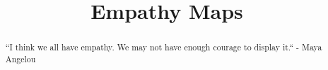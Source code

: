 \documentclass{ximera}
\title{Empathy Maps}
\begin{document}
\begin{abstract}
``I think we all have empathy. We may not have enough courage to display it.`` - Maya Angelou
\end{abstract}
\maketitle
\end{document}

